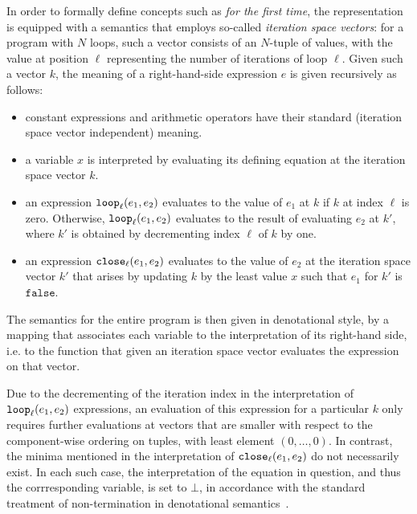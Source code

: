 In order to formally define concepts such as \emph{for the first
time}, the representation is equipped with a semantics that employs
so-called
\emph{iteration space vectors}: for a program with $N$ loops, such
a vector consists of an $N$-tuple of values, with the value at
position $\ell$ representing the number of iterations of loop $\ell$.
Given such a vector $k$, the meaning of a right-hand-side expression
$e$ is given recursively as follows:

\begin{itemize} 

\item 
constant expressions and arithmetic operators have their standard
(iteration space vector independent) meaning.

\item a variable $x$ is interpreted by evaluating its defining
equation at the iteration space vector $k$.

\item an expression $\mathtt{loop}_{{\ell}}({e_1},{e_2})$ evaluates to the value of
$e_1$ at $k$ if $k$ at index $\ell$ is zero. Otherwise, $\mathtt{loop}_{{\ell}}({e_1},{e_2})$ evaluates to the result of evaluating $e_2$ at $k'$,
where $k'$ is obtained by decrementing index $\ell$ of $k$ by one.

\item an expression $\mathtt{close}_{{\ell}}({e_1},{e_2})$ evaluates to the value
of $e_2$ at the iteration space vector $k'$ that arises by updating
$k$ by the least value $x$ such that $e_1$ for $k'$ is
$\mathtt{false}$.

\end{itemize}

The semantics for the entire program is then given in denotational
style, by a mapping that associates each variable to the
interpretation of its right-hand side, i.e. to the function that given
an iteration space vector evaluates the expression on that vector.

Due to the decrementing of the iteration index in the interpretation
of $\mathtt{loop}_{{\ell}}({e_1},{e_2})$ expressions, an evaluation of this
expression for a particular $k$ only requires further evaluations at
vectors that are smaller with respect to the component-wise ordering
on tuples, with least element $(0,\ldots,0)$. In contrast, the minima
mentioned in the interpretation of $\mathtt{close}_{{\ell}}({e_1},{e_2})$ do not necessarily exist. In each such case, the interpretation
of the equation in question, and thus the corrresponding variable, is
set to $\bot$, in accordance with the standard treatment of
non-termination in denotational semantics~\cite{winskel_93_formal}.

